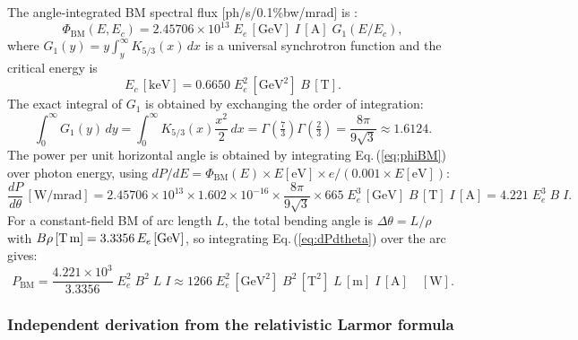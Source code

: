 \documentclass[11pt,a4paper]{article}
\begin{document}
The angle-integrated BM spectral flux [ph/s/0.1\%bw/mrad] is \cite{green1976}:
\begin{equation}
  \Phi_\text{BM}(E,E_c) = 2.45706\times10^{13}\; E_e\,[\text{GeV}]\; I\,[\text{A}]
    \; G_1(E/E_c),
  \label{eq:phiBM}
\end{equation}
where $G_1(y) = y\int_y^\infty K_{5/3}(x)\,dx$ is a universal synchrotron function
and the critical energy is
\begin{equation}
  E_c\,[\text{keV}] = 0.6650\; E_e^2\,[\text{GeV}^2]\; B\,[\text{T}].
  \label{eq:ec}
\end{equation}
The exact integral of $G_1$ is obtained by exchanging the order of integration:
\begin{equation}
  \int_0^\infty G_1(y)\,dy
  = \int_0^\infty K_{5/3}(x)\frac{x^2}{2}\,dx
  = \Gamma\!\left(\tfrac{7}{3}\right)\Gamma\!\left(\tfrac{2}{3}\right)
  = \frac{8\pi}{9\sqrt{3}} \approx 1.6124.
  \label{eq:G1int}
\end{equation}
The power per unit horizontal angle is obtained by integrating Eq.\,(\ref{eq:phiBM})
over photon energy, using $dP/dE = \Phi_\text{BM}(E)\times E[\text{eV}]\times e / (0.001\times E[\text{eV}])$:
\begin{equation}
  \frac{dP}{d\theta}\,[\text{W/mrad}]
  = 2.45706\times10^{13} \times 1.602\times10^{-16}
    \times \frac{8\pi}{9\sqrt{3}} \times 665\;
    E_e^3\,[\text{GeV}]\; B\,[\text{T}]\; I\,[\text{A}]
  = 4.221\; E_e^3\; B\; I.
  \label{eq:dPdtheta}
\end{equation}
For a constant-field BM of arc length $L$, the total bending angle is
$\Delta\theta = L/\rho$ with $B\rho\,[\text{T\,m}] = 3.3356\,E_e\,[\text{GeV}]$,
so integrating Eq.\,(\ref{eq:dPdtheta}) over the arc gives:
\begin{equation}
  P_\text{BM} = \frac{4.221\times10^3}{3.3356}\; E_e^2\; B^2\; L\; I
  \approx 1266\; E_e^2\,[\text{GeV}^2]\; B^2\,[\text{T}^2]\; L\,[\text{m}]\; I\,[\text{A}]
  \quad[\text{W}].
  \label{eq:PBM}
\end{equation}

\subsubsection*{Independent derivation from the relativistic Larmor formula}
\end{document}
